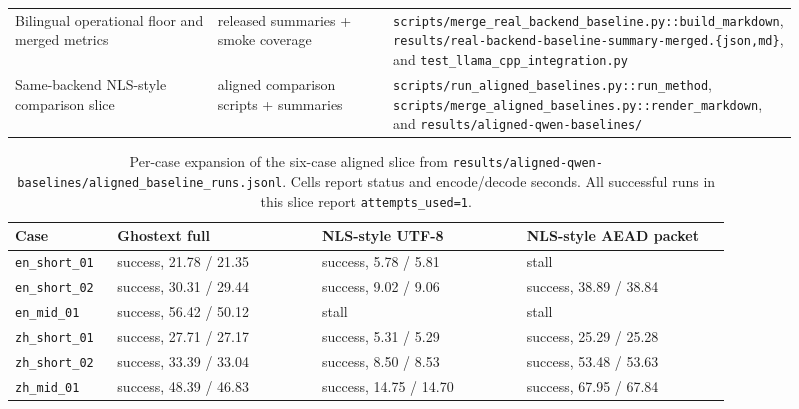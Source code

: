 \begin{table}[h]
\begin{tabular}{p{0.28\linewidth}p{0.24\linewidth}p{0.39\linewidth}}
Bilingual operational floor and merged metrics & released summaries + smoke coverage & \nolinkurl{scripts/merge_real_backend_baseline.py::build_markdown}, \nolinkurl{results/real-backend-baseline-summary-merged.{json,md}}, and \nolinkurl{test_llama_cpp_integration.py} \\
Same-backend NLS-style comparison slice & aligned comparison scripts + summaries & \nolinkurl{scripts/run_aligned_baselines.py::run_method}, \nolinkurl{scripts/merge_aligned_baselines.py::render_markdown}, and \nolinkurl{results/aligned-qwen-baselines/} \\
\bottomrule
\end{tabular}
\end{table}

\begin{table}[t]
\caption{Per-case expansion of the six-case aligned slice from \nolinkurl{results/aligned-qwen-baselines/aligned_baseline_runs.jsonl}. Cells report status and encode/decode seconds. All successful runs in this slice report \texttt{attempts\_used=1}.}
\label{tab:aligned-nls-per-case}
\small
\setlength{\tabcolsep}{4pt}
\begin{tabular}{p{0.13\linewidth}p{0.26\linewidth}p{0.26\linewidth}p{0.26\linewidth}}
\toprule
Case & Ghostext full & NLS-style UTF-8 & NLS-style AEAD packet \\
\midrule
\texttt{en\_short\_01} & success, 21.78 / 21.35 & success, 5.78 / 5.81 & stall \\
\texttt{en\_short\_02} & success, 30.31 / 29.44 & success, 9.02 / 9.06 & success, 38.89 / 38.84 \\
\texttt{en\_mid\_01} & success, 56.42 / 50.12 & stall & stall \\
\texttt{zh\_short\_01} & success, 27.71 / 27.17 & success, 5.31 / 5.29 & success, 25.29 / 25.28 \\
\texttt{zh\_short\_02} & success, 33.39 / 33.04 & success, 8.50 / 8.53 & success, 53.48 / 53.63 \\
\texttt{zh\_mid\_01} & success, 48.39 / 46.83 & success, 14.75 / 14.70 & success, 67.95 / 67.84 \\
\bottomrule
\end{tabular}
\end{table}

